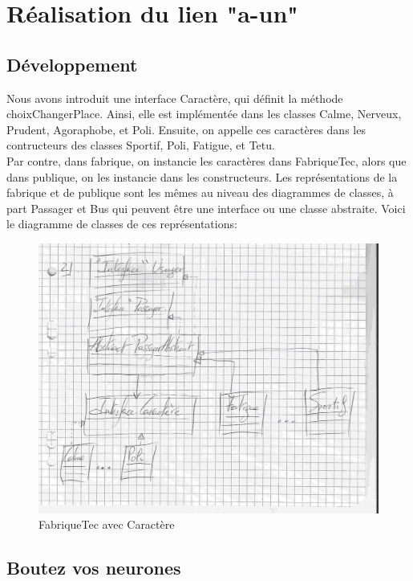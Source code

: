 \documentclass[a4paper,11pt]{article}
\begin{document}
\section{Réalisation du lien "a-un"}
\subsection{Développement}
Nous avons introduit une interface Caractère, qui définit la méthode choixChangerPlace. Ainsi, elle est implémentée dans les classes Calme, Nerveux, Prudent, Agoraphobe, et Poli. Ensuite, on appelle ces caractères dans les contructeurs des classes Sportif, Poli, Fatigue, et Tetu.\\
Par contre, dans fabrique, on instancie les caractères dans FabriqueTec, alors que dans publique, on les instancie dans les constructeurs. 
Les représentations de la fabrique et de publique sont les mêmes au niveau des diagrammes de classes, à part Passager et Bus qui peuvent être une interface ou une classe abstraite. 
Voici le diagramme de classes de ces représentations:

\begin{figure}[t]
  \begin{center}
    \caption{FabriqueTec avec Caractère}
    \includegraphics[scale=0.1]{Diag3.jpg}
  \end{center}
\end{figure}

\subsection{Boutez vos neurones}
\end{document}
